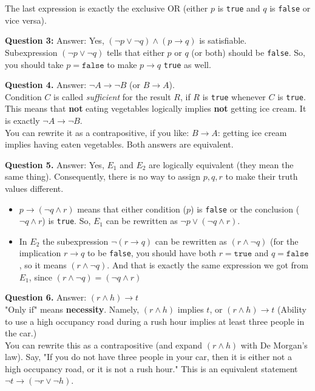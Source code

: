 \documentclass[jou]{apa6}
\begin{document}
{The last expression is exactly the exclusive OR (either $p$ is {\tt true} and
$q$ is {\tt false} or vice versa).

\vspace{10pt}
{\bf Question 3:} Answer: Yes,
$(\neg p \vee \neg q) \wedge (p \rightarrow q)$ is 
satisfiable.\\
Subexpression $(\neg p \vee \neg q)$ tells that either $p$ 
or $q$ (or both) should be {\tt false}. So, you should take
$p = \mathtt{false}$ to make $p \rightarrow q$ {\tt true} as well. 


\vspace{10pt}
{\bf Question 4.} Answer: $\neg A \rightarrow \neg B$ (or $B \rightarrow A$).\\
Condition $C$ is called {\em sufficient} for the result $R$, if 
$R$ is {\tt true} whenever $C$ is {\tt true}. 
This means that {\bf not} eating vegetables logically implies {\bf not} 
getting ice cream. It is exactly $\neg A \rightarrow \neg B$.\\
You can rewrite it as a contrapositive, if you like: $B \rightarrow A$:
getting ice cream implies having eaten vegetables. Both answers are
equivalent.

\vspace{10pt}
{\bf Question 5.} Answer: Yes, $E_1$ and $E_2$ are logically equivalent 
(they mean the same thing).
Consequently, there is no way to assign $p,q,r$ to make their truth values different.

\begin{itemize}
\item $p \rightarrow (\neg q \wedge r)$ means that either condition ($p$) is {\tt false} or 
the conclusion ($\neg q \wedge r$) is {\tt true}. So, $E_1$ can be rewritten as 
$\neg p \vee (\neg q \wedge r)$.
\item In $E_2$ the subexpression 
$\neg(r \rightarrow q)$ can be rewritten as $(r \wedge \neg q)$
(for the implication $r \rightarrow q$ to be {\tt false}, you should have
both $r = \mathtt{true}$ and $q = \mathtt{false}$, so it 
means $(r \wedge \neg q)$. And that is exactly the same expression we got 
from $E_1$, since $(r \wedge \neg q) = (\neg q \wedge r)$
\end{itemize}



\vspace{10pt}
{\bf Question 6.} Answer: $(r \wedge h) \rightarrow t$\\
"Only if" means {\bf necessity}. Namely, $(r \wedge h)$ implies $t$, 
or $(r \wedge h) \rightarrow t$ (Ability to use a high occupancy road during a rush 
hour implies at least three people in the car.)\\
You can rewrite this as a contrapositive (and expand $(r \wedge h)$ 
with De Morgan's law). Say, "If you do not have three people
in your car, then it is either not a high occupancy road, or it is not a rush hour."
This is an equivalent statement $\neg t \rightarrow (\neg r \vee \neg h)$. 


}
\end{document}
